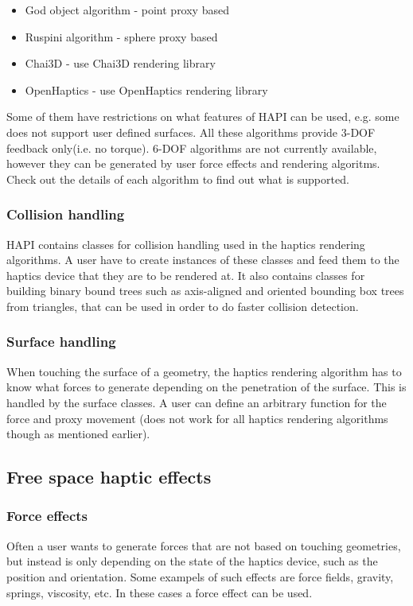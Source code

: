 \begin{itemize}
\item God object algorithm - point proxy based
\item Ruspini algorithm - sphere proxy based
\item Chai3D - use Chai3D rendering library
\item OpenHaptics - use OpenHaptics rendering library
\end{itemize}

Some of them have restrictions on what features of HAPI can be used, e.g. some does not support user defined surfaces. All these algorithms provide 3-DOF feedback only(i.e. no torque). 6-DOF algorithms are not currently available, however they can be generated by user force effects and rendering algoritms. Check out the details of each algorithm to find out what is supported.

\subsubsection{Collision handling}
HAPI contains classes for collision handling used in the
haptics rendering algorithms. A user have to create instances of these
classes and feed them to the haptics device that they are to be
rendered at. It also contains classes for building binary bound trees
such as axis-aligned and oriented bounding box trees from triangles,
that can be used in order to do faster collision detection. 

\subsubsection{Surface handling}
When touching the surface of a geometry, the haptics rendering
algorithm has to know what forces to generate depending on the
penetration of the surface. This is handled by the surface classes. A
user can define an arbitrary function for the force and proxy
movement (does not work for all haptics rendering algorithms though as
mentioned earlier).

\subsection{Free space haptic effects}

\subsubsection{Force effects}
Often a user wants to generate forces that are not based on
touching geometries, but instead is only depending on the state of the haptics device, such as the position and orientation. Some exampels of such effects are force fields, gravity, springs, viscosity, etc. In these cases a force effect can be used.

